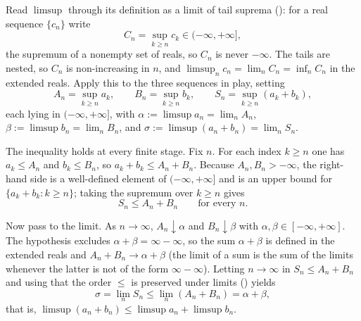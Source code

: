 \documentclass[main.tex]{subfiles}
\begin{document}
\begin{Solution}
Read $\limsup$ through its definition as a limit of tail suprema (): for a real sequence
$\{c_n\}$ write
\[
C_n=\sup_{k\ge n}c_k\in(-\infty,+\infty],
\]
the supremum of a nonempty set of reals, so $C_n$ is never $-\infty$. The tails are nested, so $C_n$ is
non-increasing in $n$, and $\limsup_n c_n=\lim_n C_n=\inf_n C_n$ in the extended reals. Apply this to
the three sequences in play, setting
\[
A_n=\sup_{k\ge n}a_k,\qquad B_n=\sup_{k\ge n}b_k,\qquad S_n=\sup_{k\ge n}(a_k+b_k),
\]
each lying in $(-\infty,+\infty]$, with $\alpha:=\limsup a_n=\lim_n A_n$, $\beta:=\limsup b_n=\lim_n B_n$,
and $\sigma:=\limsup(a_n+b_n)=\lim_n S_n$.

The inequality holds at every finite stage. Fix $n$. For each index $k\ge n$ one has $a_k\le A_n$ and
$b_k\le B_n$, so $a_k+b_k\le A_n+B_n$. Because $A_n,B_n>-\infty$, the right-hand side is a well-defined
element of $(-\infty,+\infty]$ and is an upper bound for $\{a_k+b_k:k\ge n\}$; taking the supremum over
$k\ge n$ gives
\[
S_n\le A_n+B_n\qquad\text{for every }n.
\]

Now pass to the limit. As $n\to\infty$, $A_n\downarrow\alpha$ and $B_n\downarrow\beta$ with
$\alpha,\beta\in[-\infty,+\infty]$. The hypothesis excludes $\alpha+\beta=\infty-\infty$, so the sum
$\alpha+\beta$ is defined in the extended reals and $A_n+B_n\to\alpha+\beta$ (the limit of a sum is the
sum of the limits whenever the latter is not of the form $\infty-\infty$). Letting $n\to\infty$ in
$S_n\le A_n+B_n$ and using that the order $\le$ is preserved under limits () yields
\[
\sigma=\lim_n S_n\le\lim_n(A_n+B_n)=\alpha+\beta,
\]
that is, $\limsup(a_n+b_n)\le\limsup a_n+\limsup b_n$.
\end{Solution}
\end{document}

